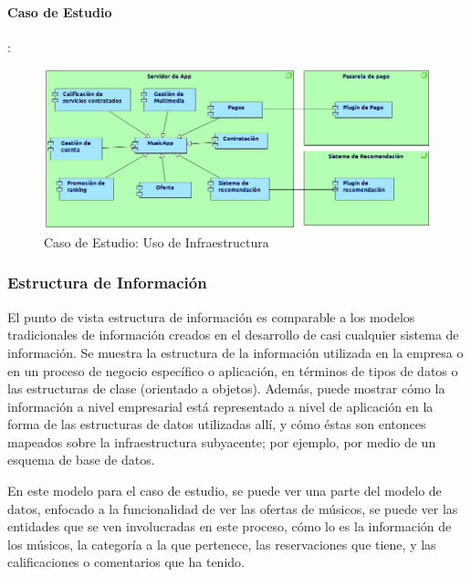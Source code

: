 \paragraph{Caso de Estudio}:

\begin{figure}[h!]
	\centering
	\includegraphics[width=\linewidth]{Desarrollo/ArquitecturaEmpresarial/Tecnologia/imgs/uso2.png}
	\caption{Caso de Estudio: Uso de Infraestructura}
\end{figure}

\newpage

\subsubsection{Estructura de Información}
El punto de vista estructura de información es comparable a los modelos tradicionales de información creados en el desarrollo de casi cualquier sistema de información. Se muestra la estructura de la información utilizada en la empresa o en un proceso de negocio específico o aplicación, en términos de tipos de datos o las estructuras de clase (orientado a objetos). Además, puede mostrar cómo la información a nivel empresarial está representado a nivel de aplicación en la forma de las estructuras de datos utilizadas allí, y cómo éstas son entonces mapeados sobre la infraestructura subyacente; por ejemplo, por medio de un esquema de base de datos.  \vspace{\baselineskip}

En este modelo para el caso de estudio, se puede ver una parte del modelo de datos, enfocado a la funcionalidad de ver las ofertas de músicos, se puede ver las entidades que se ven involucradas en este proceso, cómo lo es la información de los músicos, la categoría a la que pertenece, las reservaciones que tiene, y las calificaciones o comentarios que ha tenido.

